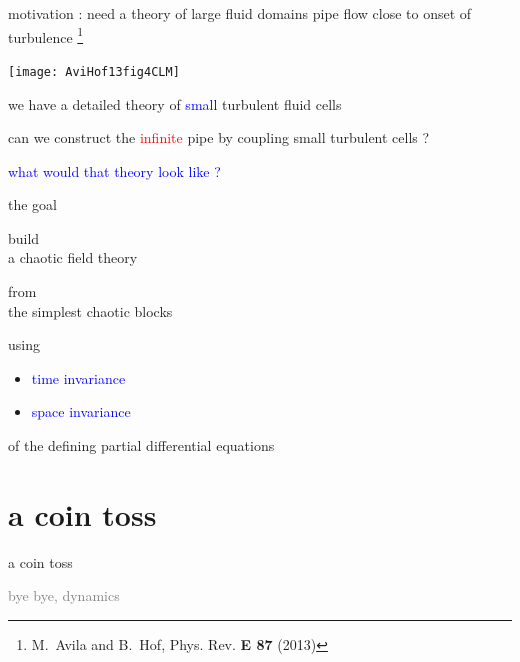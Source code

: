 \begin{frame}{motivation : need a theory of {\Huge large} fluid domains}
pipe flow close to onset of turbulence
\footnote{M.~Avila and B.~Hof, {Phys. Rev. \bf E 87} (2013)}
\begin{center}
\texttt{[image: AviHof13fig4CLM]}
\end{center}
we have a detailed theory of {\small \textcolor{blue}{small}} turbulent fluid cells

\bigskip

can we construct the \textcolor{red}{infinite} pipe by coupling small turbulent cells ?
\bigskip

\textcolor{blue}{what would that theory look like ?}
\end{frame}


\begin{frame}{the goal}
\vfill

\begin{center}
{\Large build
\\
a chaotic field theory
\medskip

from
\\
the simplest chaotic blocks}
\end{center}

\vfill
using
\begin{itemize}
  \item
\textcolor{blue}{time invariance}
  \item
\textcolor{blue}{space invariance}
\end{itemize}
 of the defining partial differential equations
\end{frame}

\section[a coin toss]
 {a coin toss}

\begin{frame}{}
\begin{enumerate}
              \item {\Large
a coin toss
                  }\textcolor{gray}{\small
              \item
\templatt
              \item
\catlatt
              \item
bye bye, dynamics
                    }
            \end{enumerate}
\end{frame}


